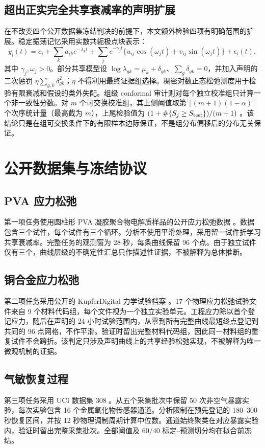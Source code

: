 \documentclass[UTF8,11pt]{ctexart}
\begin{document}
\subsection{超出正实完全共享衰减率的声明扩展}
在不改变四个公开数据集冻结判决的前提下，本文额外检验四项有明确范围的扩展。稳定振荡记忆采用实数共轭极点块表示：
\begin{equation}
y_i(t)=c_i+\sum_k a_{ik}e^{-\lambda_k t}+\sum_j e^{-\gamma_j t}\{u_{ij}\cos(\omega_jt)+v_{ij}\sin(\omega_jt)\}+\epsilon_i(t),
\label{eq:oscillatory-extension-zh}
\end{equation}
其中 $\gamma_j,\omega_j>0$。部分共享模型设 $\log\lambda_{gk}=\mu_k+\delta_{gk}$、$\sum_g\delta_{gk}=0$，并加入声明的二次惩罚 $\eta\sum_{g,k}\delta_{gk}^2$；$\eta$ 不得利用最终证据组选择。稠密对数正态松弛测度用于检验有限衰减和假设的类外失配。组级 conformal 审计则对每个独立校准组只计算一个非一致性分数。对 $m$ 个可交换校准组，其上侧阈值取第 $\lceil(m+1)(1-\alpha)\rceil$ 个次序统计量（最高截为 $m$），上尾检验值为 $(1+\#\{S_j\ge S_{\rm test}\})/(m+1)$ \cite{shafer2008conformal}。该结论只是在组可交换条件下的有限样本边际保证，不是组分布偏移后的分布无关保证。
\section{公开数据集与冻结协议}
\subsection{PVA 应力松弛}
第一项任务使用圆柱形 PVA 凝胶聚合物电解质样品的公开应力松弛数据 \cite{schelkow2026pva}。数据包含三个试件，每个试件有三个循环。分析不使用平滑处理，采用留一试件折学习共享衰减率。完整任务的观测窗为 28 秒，每条曲线保留 96 个点。由于独立试件仅有三个，曲线层级的不确定性汇总只作描述性证据，不被解释为总体推断。

\subsection{铜合金应力松弛}
第二项任务采用公开的 KupferDigital 力学试验档案 \cite{kupferdigital2024relaxation}。17 个物理应力松弛试验文件来自 9 个材料代码组，每个文件视为一个独立实验单元。工程应力除以首个登记应力，随后在声明的 24 小时试验范围内，从零到所有完整曲线最短终点登记到共同的 96 点网格，不作平滑。验证时留出完整材料代码组，因此同一材料组的重复试件不会跨折。该判定只涉及声明曲线上的共享经验松弛实现，不被解释为唯一微观机制的证据。

\subsection{气敏恢复过程}
第三项任务采用 UCI 数据集 308 \cite{ziyatdinov2015dataset}。从五个采集批次中保留 50 次非空气暴露实验，每次实验包含 16 个金属氧化物传感器通道。分析限制在预先登记的 180--300 秒恢复区间，并按 12 秒物理调制周期计算中位数。通道始终聚类在对应暴露实验内，验证时留出完整采集批次。全部阈值及 60/40 标定--预测切分均在拟合前冻结。
\end{document}
